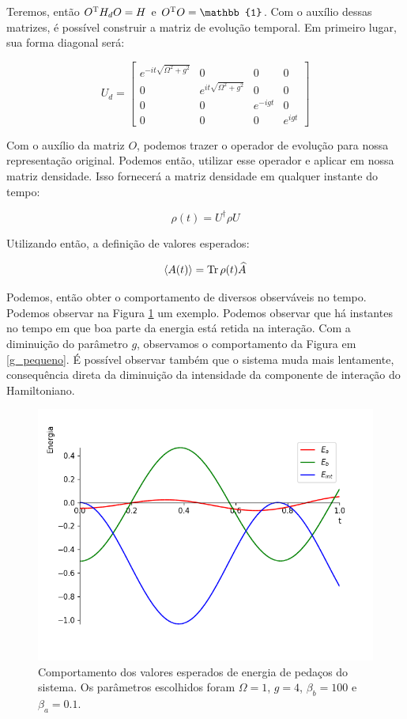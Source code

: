 Teremos, então $O^{\textsc{T}} H_d O = H$ e $O^{\textsc{T}} O = \mathbb{1}$. Com o auxílio dessas matrizes, é possível construir a matriz de evolução temporal. Em primeiro lugar, sua forma diagonal será:

\begin{equation}
U_d = \left[\begin{matrix}e^{- i t \sqrt{\Omega^{2} + g^{2}}} & 0 & 0 & 0\\0 & e^{i t \sqrt{\Omega^{2} + g^{2}}} & 0 & 0\\0 & 0 & e^{- i g t} & 0\\0 & 0 & 0 & e^{i g t}\end{matrix}\right]
\end{equation}

Com o auxílio da matriz $O$, podemos trazer o operador de evolução para nossa representação original. Podemos então, utilizar esse operador e aplicar em nossa matriz densidade. Isso fornecerá a matriz densidade em qualquer instante do tempo:

\begin{equation}
\rho(t) = U^{\dagger} \rho U
\end{equation}

Utilizando então, a definição de valores esperados:

\begin{equation}
\langle A(t) \rangle = \operatorname{Tr}{\rho(t) \widehat{A}}
\end{equation}

Podemos, então obter o comportamento de diversos observáveis no tempo. Podemos observar na Figura \ref{g_grande} um exemplo. Podemos observar que há instantes no tempo em que boa parte da energia está retida na interação. Com a diminuição do parâmetro $g$, observamos o comportamento da Figura em \ref{g_pequeno}. É possível observar também que o sistema muda mais lentamente, consequência direta da diminuição da intensidade da componente de interação do Hamiltoniano.

\begin{figure}[!ht]
\includegraphics[scale=.4]{Content/g_grande.png}
\caption{Comportamento dos valores esperados de energia de pedaços do sistema. Os parâmetros escolhidos foram $\Omega = 1$, $g = 4$, $\beta_b=100$ e $\beta_a=0.1$.}
\label{g_grande}
\end{figure}

